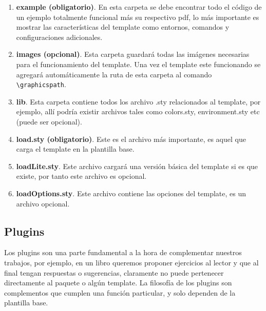 {\begin{enumerate}
		\item \textbf{example (obligatorio)}. En esta carpeta se debe encontrar todo el código de un ejemplo totalmente funcional más su respectivo pdf, lo más importante es mostrar las características del template como entornos, comandos y configuraciones adicionales. 
		\item \textbf{images (opcional)}. Esta carpeta guardará todas las imágenes necesarias para el funcionamiento del template. Una vez el template este funcionando se agregará automáticamente la ruta de esta carpeta al comando \verb|\graphicspath|.
		\item \textbf{lib}. Esta carpeta contiene todos los archivo .sty relacionados al template, por ejemplo, allí podría existir archivos tales como colors.sty, environment.sty etc (puede ser opcional).
		\item \textbf{load.sty (obligatorio)}. Este es el archivo más importante, es aquel que carga el template en la plantilla base.
		\item \textbf{loadLite.sty}. Este archivo cargará una versión básica del template si es que existe, por tanto este archivo es opcional.
		\item \textbf{loadOptions.sty}. Este archivo contiene las opciones del template, es un archivo opcional.
	\end{enumerate}
	\subsection{Plugins}
	Los plugins son una parte fundamental a la hora de complementar nuestros trabajos, por ejemplo, en un libro queremos proponer ejercicios al lector y que al final tengan respuestas o sugerencias, claramente no puede pertenecer directamente al paquete \printproject\space o algún template. \pap La filosofía de los plugins son complementos que cumplen una función particular, y solo dependen de la plantilla base.
}
